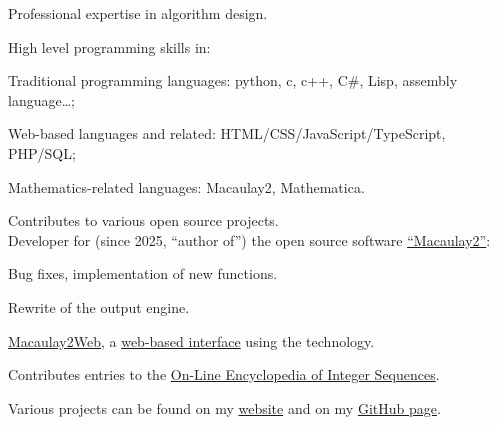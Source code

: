 \begin{cvbullets}
\item Professional expertise in algorithm design.
\item High level programming skills in:
\begin{cvitems}
\item Traditional programming languages: python, c, c++, C\#, Lisp, assembly language\dots;
\item Web-based languages and related: HTML/CSS/JavaScript/TypeScript, PHP/SQL;
\item Mathematics-related languages: Macaulay2, Mathematica.
\end{cvitems}
\item Contributes to various open source projects.\\
Developer for (since 2025, ``author of'') the open source software \href{https://www.macaulay2.com/}{``Macaulay2''}:
\begin{cvitems}
\item Bug fixes, implementation of new functions.
\item Rewrite of the output engine.
\item \href{https://github.com/pzinn/Macaulay2Web}{Macaulay2Web}, a \href{https://www.unimelb-macaulay2.cloud.edu.au}{web-based interface} using the \href{https://katex.org/}{\KaTeX} technology.
\end{cvitems}
\item Contributes entries to the \href{https://oeis.org/}{On-Line Encyclopedia of Integer Sequences}.
\item Various projects can be found on my \href{http://blogs.unimelb.edu.au/paul-zinn-justin/}{website} and on my \href{https://github.com/pzinn/}{GitHub page}.
\end{cvbullets}
